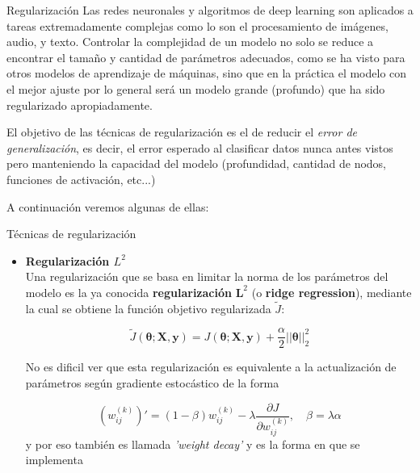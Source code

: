 \documentclass[9pt]{beamer}
\begin{document}
\begin{frame}{Regularización}
Las redes neuronales y algoritmos de deep learning son aplicados a tareas extremadamente complejas como lo son el procesamiento de imágenes, audio, y texto. Controlar la complejidad de un modelo no solo se reduce a encontrar el tamaño y cantidad de parámetros adecuados, como se ha visto para otros modelos de aprendizaje de máquinas, sino que en la práctica el modelo con el mejor ajuste por lo general será un modelo grande (profundo) que ha sido regularizado apropiadamente. \pause 

El objetivo de las técnicas de regularización es el de reducir el \textit{error de generalización}, es decir, el error esperado al clasificar datos nunca antes vistos pero manteniendo la capacidad del modelo (profundidad, cantidad de nodos, funciones de activación, etc...) \pause 

A continuación veremos algunas de ellas: 


\end{frame}


\begin{frame}{Técnicas de regularización}

\begin{itemize}
  \item \textbf{Regularización $L^2$} \\ \pause
  Una regularización que se basa en limitar la norma de los parámetros del modelo es la ya conocida \textbf{regularización} $\bm{L}^{2}$ (o \textbf{ridge regression}), mediante la cual se obtiene la función objetivo regularizada $\tilde{J}$: \pause

  \begin{equation*}
  \tilde{J}(\bm{\theta};\bm{X},\bm{y}) = J(\bm{\theta};\bm{X},\bm{y}) + \frac{\alpha}{2}||\bm{\theta}||^{2}_{2}
  \end{equation*} \pause

  No es dificil ver que esta regularización es equivalente a la actualización de parámetros según gradiente estocástico de la forma \pause

  \begin{equation*}
  (w_{ij}^{(k)})' = (1-\beta) w_{ij}^{(k)} - \lambda \frac{\partial J}{\partial w_{ij}^{(k)}}, \quad \beta = \lambda \alpha
  \end{equation*}
  y por eso también es llamada \textit{'weight decay'} y es la forma en que se implementa

\end{itemize}

\end{frame}
\end{document}
